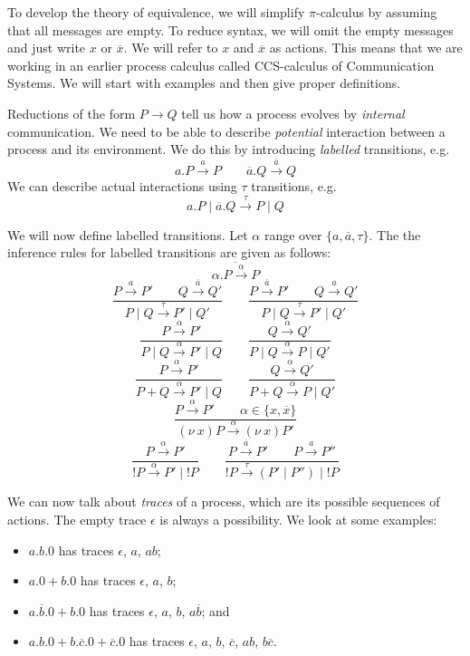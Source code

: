 \documentclass[a4paper, openany]{memoir}
\theoremstyle{definition}
\begin{document}
    To develop the theory of equivalence, we will simplify $\pi$-calculus by assuming that all messages are empty. To reduce syntax, we will omit the empty messages and just write $x$ or $\overline{x}$. We will refer to $x$ and $\overline{x}$ as actions. This means that we are working in an earlier process calculus called CCS-calculus of Communication Systems. We will start with examples and then give proper definitions.

    Reductions of the form $P \to Q$ tell us how a process evolves by \emph{internal} communication. We need to be able to describe \emph{potential} interaction between a process and its environment. We do this by introducing \emph{labelled} transitions, e.g.
    \[a.P \xrightarrow{a} P \qquad \overline{a}.Q \xrightarrow{\overline{a}} Q\]
    We can describe actual interactions using $\tau$ transitions, e.g.
    \[a.P \mid \overline{a}.Q \xrightarrow{\tau} P \mid Q\]

    We will now define labelled transitions. Let $\alpha$ range over $\{a, \overline{a}, \tau\}$. The the inference rules for labelled transitions are given as follows:
    \[\overline{\alpha.P \xrightarrow{\alpha} P}\]
    \[\frac{P \xrightarrow{a} P' \qquad Q \xrightarrow{\overline{a}} Q'}{P \mid Q \xrightarrow{\tau} P' \mid Q'} \qquad \frac{P \xrightarrow{\overline{a}} P' \qquad Q \xrightarrow{a} Q'}{P \mid Q \xrightarrow{\tau} P' \mid Q'}\]
    \[\frac{P \xrightarrow{\alpha} P'}{P \mid Q \xrightarrow{\alpha} P' \mid Q} \qquad \frac{Q \xrightarrow{\alpha} Q'}{P \mid Q \xrightarrow{\alpha} P \mid Q'}\]
    \[\frac{P \xrightarrow{\alpha} P'}{P + Q \xrightarrow{\alpha} P' \mid Q} \qquad \frac{Q \xrightarrow{\alpha} Q'}{P + Q \xrightarrow{\alpha} P \mid Q'}\]
    \[\frac{P \xrightarrow{\alpha} P' \qquad \alpha \in \{x, \overline{x}\}}{(\nu \ x)P \xrightarrow{\alpha} (\nu \ x)P'}\]
    \[\frac{P \xrightarrow{\alpha} P'}{!P \xrightarrow{\alpha} P' \mid !P} \qquad \frac{P \xrightarrow{\overline{a}} P' \qquad P \xrightarrow{a} P''}{!P \xrightarrow{\tau} (P' \mid P'') \mid !P}\]

    We can now talk about \emph{traces} of a process, which are its possible sequences of actions. The empty trace $\epsilon$ is always a possibility. We look at some examples:
    \begin{itemize}
        \item $a.b.0$ has traces $\epsilon$, $a$, $ab$;
        \item $a.0 + b.0$ has traces $\epsilon$, $a$, $b$;
        \item $a.\overline{b}.0 + b.0$ has traces $\epsilon$, $a$, $b$, $a\overline{b}$; and
        \item $a.b.0 + b.\overline{c}.0 + \overline{c}.0$ has traces $\epsilon$, $a$, $b$, $\overline{c}$, $ab$, $b\overline{c}$.
    \end{itemize}
\end{document}
